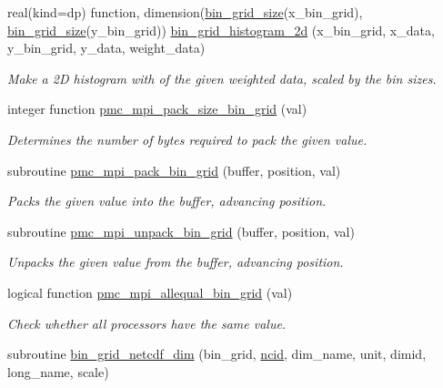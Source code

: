 \begin{DoxyCompactItemize}
real(kind=dp) function, dimension(\mbox{\hyperlink{namespacepmc__bin__grid_add81887392bce2b981cecd3cfe553a5f}{bin\+\_\+grid\+\_\+size}}(x\+\_\+bin\+\_\+grid), \mbox{\hyperlink{namespacepmc__bin__grid_add81887392bce2b981cecd3cfe553a5f}{bin\+\_\+grid\+\_\+size}}(y\+\_\+bin\+\_\+grid)) \mbox{\hyperlink{namespacepmc__bin__grid_aca186db5214b8baadd1dd1dae1be5d98}{bin\+\_\+grid\+\_\+histogram\+\_\+2d}} (x\+\_\+bin\+\_\+grid, x\+\_\+data, y\+\_\+bin\+\_\+grid, y\+\_\+data, weight\+\_\+data)
\begin{DoxyCompactList}\small\item\em Make a 2D histogram with of the given weighted data, scaled by the bin sizes. \end{DoxyCompactList}\item 
integer function \mbox{\hyperlink{namespacepmc__bin__grid_af316422f9bd046e6172d94efcea4a84f}{pmc\+\_\+mpi\+\_\+pack\+\_\+size\+\_\+bin\+\_\+grid}} (val)
\begin{DoxyCompactList}\small\item\em Determines the number of bytes required to pack the given value. \end{DoxyCompactList}\item 
subroutine \mbox{\hyperlink{namespacepmc__bin__grid_a83f71861916da3f47f6baac24cf45010}{pmc\+\_\+mpi\+\_\+pack\+\_\+bin\+\_\+grid}} (buffer, position, val)
\begin{DoxyCompactList}\small\item\em Packs the given value into the buffer, advancing position. \end{DoxyCompactList}\item 
subroutine \mbox{\hyperlink{namespacepmc__bin__grid_a0cc8644ef392c33e58b296f03899f5f5}{pmc\+\_\+mpi\+\_\+unpack\+\_\+bin\+\_\+grid}} (buffer, position, val)
\begin{DoxyCompactList}\small\item\em Unpacks the given value from the buffer, advancing position. \end{DoxyCompactList}\item 
logical function \mbox{\hyperlink{namespacepmc__bin__grid_a7a3956cc26b9ca8736fb65b47a1f8b67}{pmc\+\_\+mpi\+\_\+allequal\+\_\+bin\+\_\+grid}} (val)
\begin{DoxyCompactList}\small\item\em Check whether all processors have the same value. \end{DoxyCompactList}\item 
subroutine \mbox{\hyperlink{namespacepmc__bin__grid_a1e67dd0b3773b15d0d5523887106bcb1}{bin\+\_\+grid\+\_\+netcdf\+\_\+dim}} (bin\+\_\+grid, \mbox{\hyperlink{fractal_8_f90_a4e89f3f850921ff84a6dfce8b166ad50}{ncid}}, dim\+\_\+name, unit, dimid, long\+\_\+name, scale)

\end{DoxyCompactItemize}
